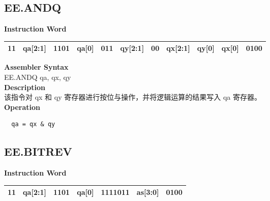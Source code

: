 \subsection{EE.ANDQ}\label{instruction:EEANDQ}
\setlength\tabcolsep{6pt}
\textbf{Instruction Word} \\
\begin{tabular}{|c|c|c|c|c|c|c|c|c|c|c|}
	\hline
	11 & qa[2:1] & 1101 & qa[0] & 011 & qy[2:1] & 00 & qx[2:1] & qy[0] & qx[0] & 0100 \\
	\hline
\end{tabular}

\textbf{Assembler Syntax} \\
EE.ANDQ qa, qx, qy \\
\textbf{Description} \\
该指令对 qx 和 qy 寄存器进行按位与操作，并将逻辑运算的结果写入 qa 寄存器。\\
\textbf{Operation}
\begin{lstlisting}
  qa = qx & qy
\end{lstlisting}

\clearpage
\subsection{EE.BITREV}\label{instruction:EEBITREV}
\setlength\tabcolsep{6pt}
\textbf{Instruction Word} \\
\begin{tabular}{|c|c|c|c|c|c|c|}
	\hline
	11 & qa[2:1] & 1101 & qa[0] & 1111011 & as[3:0] & 0100 \\
	\hline
\end{tabular}

